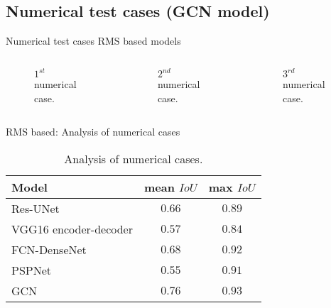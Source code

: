 \documentclass[10pt,aspectratio=169,dvipsnames]{beamer} %
\begin{document}
\subsection{Numerical test cases (GCN model)}
\setcounter{subfigure}{0}
\begin{frame}{Numerical test cases RMS based models}
	\begin{columns}[T]
		\begin{column}[c]{0.32\textwidth}
			\begin{figure}[c]
				\centering
				\caption{\(1^{st}\) numerical case.}
			\end{figure}
		\end{column}
		\hfill
		\begin{column}[c]{0.32\textwidth}
			\begin{figure}[c]
				\centering
				\caption{\(2^{nd}\) numerical case.}
			\end{figure}
		\end{column}
		\hfill
		\begin{column}[c]{0.32\textwidth}
			\begin{figure}[c]
				\centering
				\caption{\(3^{rd}\) numerical case.}
			\end{figure}
		\end{column}
	\end{columns}
\end{frame}

\begin{frame}{RMS based: Analysis of numerical cases}
	\begin{table}[ht!]
		\centering
		\caption{Analysis of numerical cases.}
		\label{tab:table_all_numerical_cases}	
		\begin{tabular}{lcc}
			\toprule
			Model & mean \(IoU\) & max \(IoU\) \\ 
			\midrule 
			Res-UNet & \(0.66\) & \(0.89\) \\ 
			VGG16 encoder-decoder & \(0.57\) & \(0.84\) \\ 
			FCN-DenseNet & \(0.68\) & \(0.92\) \\ 
			PSPNet & \(0.55\) & \(0.91\) \\ 
			GCN & \(0.76\) & \(0.93\) \\ 
			\bottomrule
		\end{tabular}
	\end{table}
\end{frame}
\end{document}
